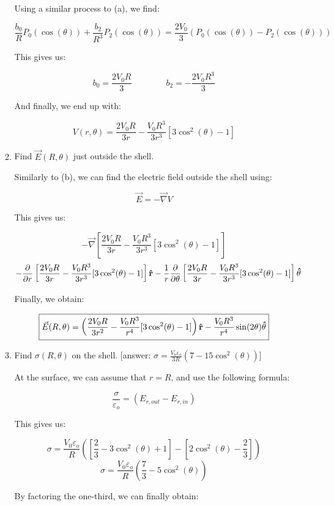 \begin{enumerate}
\begin{enumerate}
        Using a similar process to (a), we find:

        $$\frac{b_0}{R}P_0(\cos(\theta))+\frac{b_2}{R^3}P_2(\cos(\theta))=\frac{2V_0}{3}\left( P_0(\cos(\theta))-P_2(\cos(\theta)) \right)$$

        This gives us:

        $$b_0=\frac{2V_0R}{3}\quad\quad\quad\quad b_2=-\frac{2V_0R^3}{3}$$

        And finally, we end up with:

        $$\boxed{V(r,\theta)=\frac{2V_0R}{3r}-\frac{V_0R^3}{3r^3}[3\cos^2(\theta)-1]}$$

      \item Find $\vec{E}(R, \theta)$ just outside the shell.

        Similarly to (b), we can find the electric field outside the shell using:

        $$\vec{E}=-\vec{\nabla}V$$

        This gives us:

        $$-\vec{\nabla}\left[ \frac{2V_0R}{3r}-\frac{V_0R^3}{3r^3}[3\cos^2(\theta)-1] \right]$$
        $$-\frac{\partial}{\partial r}\left[ \frac{2V_0R}{3r}-\frac{V_0R^3}{3r^3}[3\cos^2(\theta)-1] \right]\bold{\hat{r}}-\frac{1}{r}\frac{\partial}{\partial \theta}\left[ \frac{2V_0R}{3r}-\frac{V_0R^3}{3r^3}[3\cos^2(\theta)-1] \right]\bold{\hat{\theta}}$$

          Finally, we obtain:

          $$\boxed{\vec{E}(R,\theta)=\left(\frac{2V_0R}{3r^2}-\frac{V_0R^3}{r^4}[3\cos^2(\theta)-1]\right)\bold{\hat{r}}-\frac{V_0R^3}{r^4}\sin(2\theta)\bold{\hat{\theta}}}$$

      \item Find $\sigma(R, \theta)$ on the shell. [answer: $\sigma = \frac{V_o\varepsilon_o}{3R}(7 - 15\cos^2(\theta))$]

        At the surface, we can assume that $r=R$, and use the following formula:

        $$\frac{\sigma }{\varepsilon_o}=\left( E_{r,out}-E_{r,in} \right)$$

        This gives us:

        $$\sigma=\frac{V_0\varepsilon_o}{R}\left( \left[ \frac{2}{3}-3\cos^2(\theta)+1\right]-\left[  2\cos^2(\theta)-\frac{2}{3}\right]\right)$$
        $$\sigma=\frac{V_0\varepsilon_o}{R}\left( \frac{7}{3}-5\cos^2(\theta)\right)$$

        By factoring the one-third, we can finally obtain:


\end{enumerate}
\end{enumerate}
